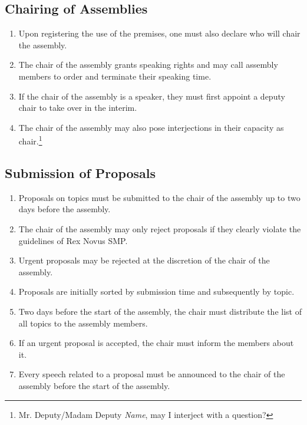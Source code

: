 \documentclass{article}
\begin{document}
\subsection{Chairing of Assemblies}
\begin{enumerate}[(1)]
	\item Upon registering the use of the premises, one must also declare who will chair the assembly.
	\item The chair of the assembly grants speaking rights and may call assembly members to order and terminate their speaking time.
	\item If the chair of the assembly is a speaker, they must first appoint a deputy chair to take over in the interim.
	\item The chair of the assembly may also pose interjections in their capacity as chair.\footnote{Mr. Deputy/Madam Deputy \textit{Name}, may I interject with a question?}
\end{enumerate}

\subsection{Submission of Proposals}
\begin{enumerate}[(1)]
	\item Proposals on topics must be submitted to the chair of the assembly up to two days before the assembly.
	\item The chair of the assembly may only reject proposals if they clearly violate the guidelines of Rex Novus SMP.
	\item Urgent proposals may be rejected at the discretion of the chair of the assembly.
	\item Proposals are initially sorted by submission time and subsequently by topic.
	\item Two days before the start of the assembly, the chair must distribute the list of all topics to the assembly members.
	\item If an urgent proposal is accepted, the chair must inform the members about it.
	\item Every speech related to a proposal must be announced to the chair of the assembly before the start of the assembly.
\end{enumerate}
\end{document}
